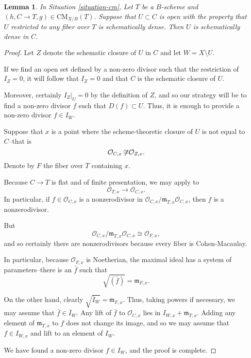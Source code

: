 \documentclass{stacks-project}
\theoremstyle{plain}
\newtheorem{lemma}[subsection]{Lemma}
\theoremstyle{definition}
\theoremstyle{remark}
\numberwithin{equation}{subsection}
\def\CMfunctor{\mathcal{C}\!{\it oh}}
\def\CMfunctor{\text{CM}}
\begin{document}
\begin{lemma}
	In Situation \ref{situation-cm}, Let $T$ be a $B$-scheme and $(h,C\rightarrow T,g)\in \CMfunctor_{X/B}(T)$.
	Suppose that $U\subset C$ is open with the property that $U$ restricted to any fiber over $T$ is schematically dense.
	Then $U$ is schematically dense in $C$.
	\label{lemma-sch-dense-in-fibers-means-sch-dense}
\end{lemma}
\begin{proof}
	Let $Z$ denote the schematic closure of $U$ in $C$ and let $W=X\setminus U$.	

	If we find an open set defined by a non-zero divisor such that the restriction of $I_Z=0$, it will follow that $I_Z=0$ and that $C$ is the schematic closure of $U$.

	Moreover, certainly $I_Z|_U=0$ by the definition of $Z$, and so our strategy will be to find a non-zero divisor $f$ such that $D(f)\subset U$.
	Thus, it is enough to provide a non-zero divisor $f\in I_W$.

	Suppose that $x$ is a point where the scheme-theoretic closure of $U$ is not equal to $C$--that is
	\[\mathcal{O}_{C,x}\not{\hspace{-.05in}\cong}\mathcal{O}_{Z,x}.\]
	Denote by $F$ the fiber over $T$ containing $x$.

	Because $C\rightarrow T$ is flat and of finite presentation, we may apply \cite[Tag 046Z]{stacks-project} to 
	\[\mathcal{O}_{T,x}\rightarrow\mathcal{O}_{C,x}.\]
	In particular, if $f\in\mathcal{O}_{C,x}$ is a nonzerodivisor
	in $\mathcal{O}_{C,x}/\mathfrak{m}_{T,x}\mathcal{O}_{C,x}$, then $f$ 
	is a nonzerodivisor.

	But 
	\[\mathcal{O}_{C,x}/\mathfrak{m}_{T,x}\mathcal{O}_{C,x}\cong\mathcal{O}_{F,x},\]
	and so certainly there are nonzerodivisors because every fiber is Cohen-Macaulay.

	In particular, because $\mathcal{O}_{F,x}$ is Noetherian, the maximal ideal has a system of parameters--there is an $\bar{f}$ such that
	\[\sqrt{(\bar{f})}=\mathfrak{m}_{F,x}.\]

	On the other hand, clearly $\sqrt{\overline{I}_W}=\mathfrak{m}_{F,x}$.
	Thus, taking powers if necessary, we may assume that $\bar{f}\in\overline{I}_W$.
	Any lift of $\bar{f}$ to $\mathcal{O}_{C,x}$ lies in $I_{W,x}+\mathfrak{m}_{T,x}$.
	Adding any element of $\mathfrak{m}_{T,x}$ to $f$ does not change its image, and so we may assume that $f\in I_{W,x}$ and lift to an element of $I_W$.

	We have found a non-zero divisor $f\in I_W$, and the proof is complete.
\end{proof}


\end{document}
